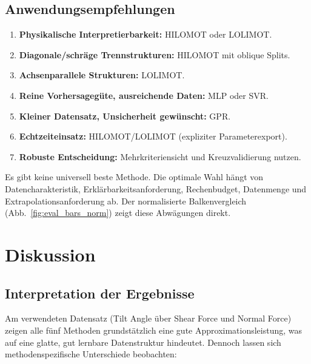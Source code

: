 \documentclass[11pt,a4paper]{report}
\begin{document}
\section{Anwendungsempfehlungen}

\begin{enumerate}
\item \textbf{Physikalische Interpretierbarkeit:} HILOMOT oder LOLIMOT.
\item \textbf{Diagonale/schr\"{a}ge Trennstrukturen:} HILOMOT mit oblique Splits.
\item \textbf{Achsenparallele Strukturen:} LOLIMOT.
\item \textbf{Reine Vorhersageg\"{u}te, ausreichende Daten:} MLP oder SVR.
\item \textbf{Kleiner Datensatz, Unsicherheit gew\"{u}nscht:} GPR.
\item \textbf{Echtzeiteinsatz:} HILOMOT/LOLIMOT (expliziter Parameterexport).
\item \textbf{Robuste Entscheidung:} Mehrkriteriensicht und Kreuzvalidierung nutzen.
\end{enumerate}

\begin{merkbox}
Es gibt keine universell beste Methode. Die optimale Wahl h\"{a}ngt von Datencharakteristik,
Erkl\"{a}rbarkeitsanforderung, Rechenbudget, Datenmenge und Extrapolationsanforderung ab.
Der normalisierte Balkenvergleich (Abb.~\ref{fig:eval_bars_norm}) zeigt diese Abw\"{a}gungen
direkt.
\end{merkbox}

\chapter{Diskussion}

\section{Interpretation der Ergebnisse}

Am verwendeten Datensatz (Tilt Angle \"{u}ber Shear Force und Normal Force) zeigen alle f\"{u}nf
Methoden grundst\"{a}tzlich eine gute Approximationsleistung, was auf eine glatte, gut lernbare
Datenstruktur hindeutet. Dennoch lassen sich methodenspezifische Unterschiede beobachten:
\end{document}
